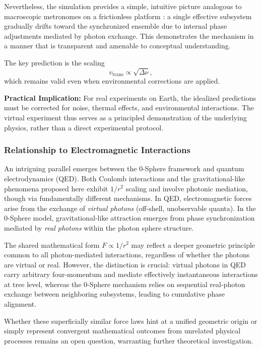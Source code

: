 \documentclass[
 reprint,
 amsmath,amssymb,
 aps,
 prb,
]{revtex4-2}
\numberwithin{equation}{section}
\begin{document}
Nevertheless, the simulation provides a simple, intuitive picture analogous to macroscopic metronomes on a frictionless platform \cite{Bennett2002}: a single effective subsystem gradually drifts toward the synchronized ensemble due to internal phase adjustments mediated by photon exchange. This demonstrates the mechanism in a manner that is transparent and amenable to conceptual understanding.

The key prediction is the scaling
\begin{equation}
v_\text{trans} \propto \sqrt{\Delta\nu},
\end{equation}
which remains valid even when environmental corrections are applied.

\vspace{0.5cm}

\textbf{Practical Implication:} For real experiments on Earth, the idealized predictions must be corrected for noise, thermal effects, and environmental interactions. The virtual experiment thus serves as a principled demonstration of the underlying physics, rather than a direct experimental protocol.

\subsubsection{Relationship to Electromagnetic Interactions}

An intriguing parallel emerges between the 0-Sphere framework and quantum electrodynamics (QED). Both Coulomb interactions and the gravitational-like phenomena proposed here exhibit $1/r^2$ scaling and involve photonic mediation, though via fundamentally different mechanisms. In QED, electromagnetic forces arise from the exchange of \textit{virtual photons} (off-shell, unobservable quanta). In the 0-Sphere model, gravitational-like attraction emerges from phase synchronization mediated by \textit{real photons} within the photon sphere structure.

The shared mathematical form $F \propto 1/r^2$ may reflect a deeper geometric principle common to all photon-mediated interactions, regardless of whether the photons are virtual or real. However, the distinction is crucial: virtual photons in QED carry arbitrary four-momentum and mediate effectively instantaneous interactions at tree level, whereas the 0-Sphere mechanism relies on sequential real-photon exchange between neighboring subsystems, leading to cumulative phase alignment.

Whether these superficially similar force laws hint at a unified geometric origin or simply represent convergent mathematical outcomes from unrelated physical processes remains an open question, warranting further theoretical investigation.
\end{document}
